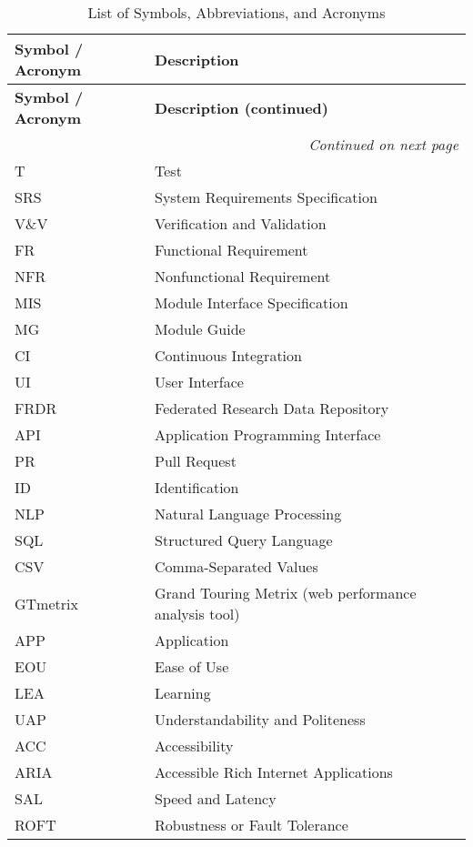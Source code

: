 \documentclass[12pt, titlepage]{article}
\begin{document}
\renewcommand{\arraystretch}{1.2}
\begin{longtable}{l l}
  \caption{List of Symbols, Abbreviations, and Acronyms} \\
  \toprule
  \textbf{Symbol / Acronym} & \textbf{Description} \\
  \midrule
  \endfirsthead

  \toprule
  \textbf{Symbol / Acronym} & \textbf{Description (continued)} \\
  \midrule
  \endhead

  \bottomrule
  \multicolumn{2}{r}{\textit{Continued on next page}} \\
  \endfoot

  \bottomrule
  \endlastfoot

  T & Test \\
  SRS & System Requirements Specification \\
  V\&V & Verification and Validation \\
  FR & Functional Requirement \\
  NFR & Nonfunctional Requirement \\
  MIS & Module Interface Specification \\
  MG & Module Guide \\
  CI & Continuous Integration \\
  UI & User Interface \\
  FRDR & Federated Research Data Repository \\
  API & Application Programming Interface \\
  PR & Pull Request \\
  ID & Identification \\
  NLP & Natural Language Processing \\
  SQL & Structured Query Language \\
  CSV & Comma-Separated Values \\
  GTmetrix & Grand Touring Metrix (web performance analysis tool) \\
  APP & Application \\
  EOU & Ease of Use \\
  LEA & Learning \\
  UAP & Understandability and Politeness \\
  ACC & Accessibility \\
  ARIA & Accessible Rich Internet Applications \\
  SAL & Speed and Latency \\
  ROFT & Robustness or Fault Tolerance \\

\end{longtable}
\end{document}
